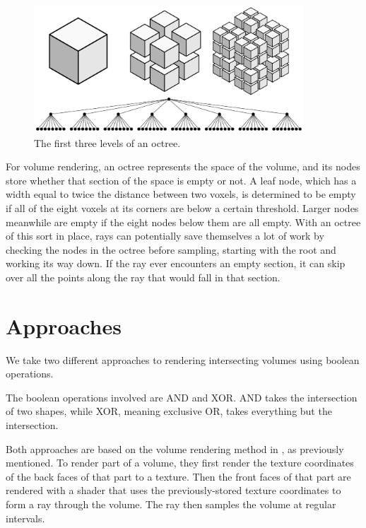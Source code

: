 \documentclass{report}
\begin{document}
\begin{figure}
\centering
\includegraphics[width=0.9\textwidth]{octree.pdf}
\caption{The first three levels of an octree.}
\label{octree}
\end{figure}

For volume rendering, an octree represents the space of the volume, and its
nodes store whether that section of the space is empty or not.  A leaf node,
which has a width equal to twice the distance between two voxels, is determined
to be empty if all of the eight voxels at its corners are below a certain
threshold.  Larger nodes meanwhile are empty if the eight nodes below them are
all empty.  With an octree of this sort in place, rays can potentially save
themselves a lot of work by checking the nodes in the octree before sampling,
starting with the root and working its way down.  If the ray ever encounters an
empty section, it can skip over all the points along the ray that would fall in
that section.

\chapter{Approaches}

We take two different approaches to rendering intersecting volumes using boolean
operations.

The boolean operations involved are AND and XOR.  AND takes the intersection of
two shapes, while XOR, meaning exclusive OR, takes everything but the
intersection.

Both approaches are based on the volume rendering method in \cite{Kruger03}, as
previously mentioned.  To render part of a volume, they first render the texture
coordinates of the back faces of that part to a texture.  Then the front faces
of that part are rendered with a shader that uses the previously-stored texture
coordinates to form a ray through the volume.  The ray then samples the volume
at regular intervals.
\end{document}

